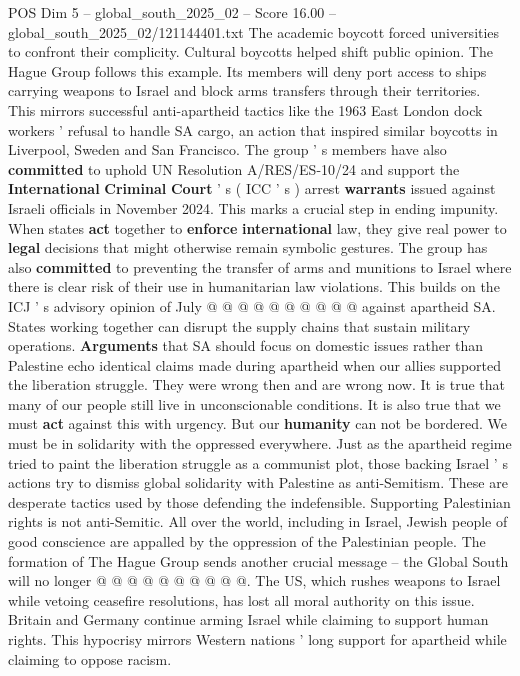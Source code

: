 \begin{textsample}{POS Dim 5 – global\_south\_2025\_02 – Score 16.00 – global\_south\_2025\_02/121144401.txt}
The academic boycott forced universities to confront their complicity.
Cultural boycotts helped shift public opinion.
The Hague Group follows this example.
Its members will deny port access to ships carrying weapons to Israel and block arms transfers through their territories.
This mirrors successful anti-apartheid tactics like the 1963 East London dock workers ' refusal to handle SA cargo, an action that inspired similar boycotts in Liverpool, Sweden and San Francisco.
The group ' s members have also \textbf{committed} to uphold UN Resolution A/RES/ES-10/24 and support the \textbf{International} \textbf{Criminal} \textbf{Court} ' s ( ICC ' s ) arrest \textbf{warrants} issued against Israeli officials in November 2024.
This marks a crucial step in ending impunity.
When states \textbf{act} together to \textbf{enforce} \textbf{international} law, they give real power to \textbf{legal} decisions that might otherwise remain symbolic gestures.
The group has also \textbf{committed} to preventing the transfer of arms and munitions to Israel where there is clear risk of their use in humanitarian law violations.
This builds on the ICJ ' s advisory opinion of July @ @ @ @ @ @ @ @ @ @ against apartheid SA.
States working together can disrupt the supply chains that sustain military operations. \textbf{Arguments} that SA should focus on domestic issues rather than Palestine echo identical claims made during apartheid when our allies supported the liberation struggle.
They were wrong then and are wrong now.
It is true that many of our people still live in unconscionable conditions.
It is also true that we must \textbf{act} against this with urgency.
But our \textbf{humanity} can not be bordered.
We must be in solidarity with the oppressed everywhere.
Just as the apartheid regime tried to paint the liberation struggle as a communist plot, those backing Israel ' s actions try to dismiss global solidarity with Palestine as anti-Semitism.
These are desperate tactics used by those defending the indefensible.
Supporting Palestinian rights is not anti-Semitic.
All over the world, including in Israel, Jewish people of good conscience are appalled by the oppression of the Palestinian people.
The formation of The Hague Group sends another crucial message -- the Global South will no longer @ @ @ @ @ @ @ @ @ @.
The US, which rushes weapons to Israel while vetoing ceasefire resolutions, has lost all moral authority on this issue.
Britain and Germany continue arming Israel while claiming to support human rights.
This hypocrisy mirrors Western nations ' long support for apartheid while claiming to oppose racism.

\end{textsample}
